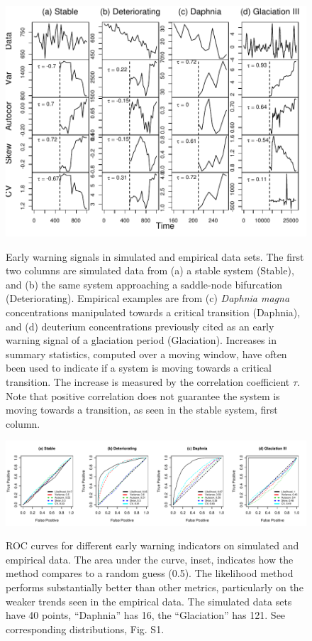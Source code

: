 \documentclass[authoryear,preprint,11pt]{elsarticle}
\begin{document}
 \begin{figure}[h]
   \begin{center}
     \includegraphics[width=\linewidth]{Fig2}
     \label{fig2}
     \caption{Early warning signals in simulated and empirical data sets.  The first two columns are simulated data from (a) a stable system (Stable), and (b) the same system approaching a saddle-node bifurcation (Deteriorating).  Empirical examples are from (c) \emph{Daphnia magna} concentrations manipulated towards a critical transition (Daphnia), and (d) deuterium concentrations previously cited as an early warning signal of a glaciation period (Glaciation). Increases in summary statistics, computed over a moving window, have often been used to indicate if a system is moving towards a critical transition.  The increase is measured by the correlation coefficient $\tau$.  Note that positive correlation does not guarantee the system is moving towards a transition, as seen in the stable system, first column.}
  \end{center}
 \end{figure}



 \begin{figure}[h]
   \begin{center}
     \includegraphics[width=\linewidth]{Fig3.pdf}
     \label{fig3}
     \caption{ROC curves for different early warning indicators on simulated and empirical data.  The area under the curve, inset, indicates how the method compares to a random guess (0.5).  The likelihood method performs substantially better than other metrics, particularly on the weaker trends seen in the empirical data. The simulated data sets have 40 points, ``Daphnia'' has 16, the ``Glaciation'' has 121. See corresponding distributions, Fig. S1.}
  \end{center}
 \end{figure}
\end{document}
